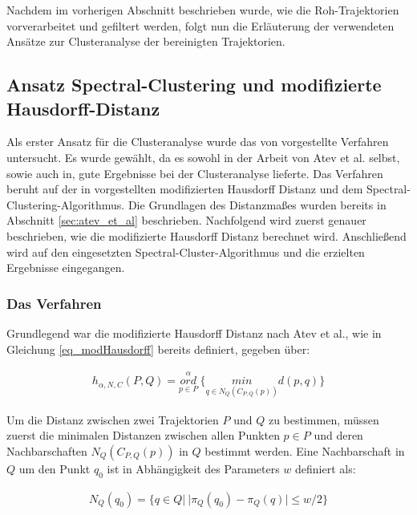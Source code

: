 Nachdem im vorherigen Abschnitt beschrieben wurde, wie die Roh-Trajektorien vorverarbeitet und gefiltert
werden, folgt nun die Erläuterung der verwendeten Ansätze zur Clusteranalyse der bereinigten Trajektorien.

\subsection{Ansatz Spectral-Clustering und modifizierte Hausdorff-Distanz}
\label{sec:real_ansatz_spec_modHD}

Als erster Ansatz für die Clusteranalyse wurde das von \cite[]{Atev2010} vorgestellte Verfahren untersucht.
Es wurde gewählt, da es sowohl in der Arbeit von Atev et al. selbst, sowie auch in\cite[]{Morris2009}, gute Ergebnisse
bei der Clusteranalyse lieferte.
Das Verfahren beruht auf der in \cite[]{Atev2006} vorgestellten modifizierten Hausdorff Distanz und dem
Spectral-Clustering-Algorithmus. Die Grundlagen des Distanzmaßes wurden bereits in Abschnitt
\ref{sec:atev_et_al} beschrieben. Nachfolgend wird zuerst genauer beschrieben, wie die
modifizierte Hausdorff Distanz berechnet wird. Anschließend
wird auf den eingesetzten Spectral-Cluster-Algorithmus und die erzielten Ergebnisse eingegangen.

\subsubsection{Das Verfahren}

Grundlegend war die modifizierte Hausdorff Distanz nach Atev et al., wie in Gleichung \ref{eq_modHausdorff}
bereits definiert, gegeben über:

\begin{ceqn}
\begin{align*}
    h_{\alpha, N, C}(P, Q) = \overset{\alpha}{\underset{p \in P}{ord}}\ \Big\{ \underset{q \in N_Q(C_{P,Q}(p))}{min} d(p, q) \Big\}
\end{align*}
\end{ceqn}

Um die Distanz zwischen zwei Trajektorien $P$ und $Q$ zu bestimmen, müssen zuerst die minimalen Distanzen
zwischen allen Punkten $p \in P$ und deren Nachbarschaften $N_Q(C_{P,Q}(p))$ in $Q$ bestimmt werden.
Eine Nachbarschaft in $Q$ um den Punkt $q_0$ ist in Abhängigkeit des Parameters $w$ definiert als:

\begin{ceqn}
\begin{align}
    N_Q(q_0) = \{ q \in Q |\ |\pi_Q(q_0) - \pi_Q(q)| \le w/2 \}
\end{align}
\end{ceqn}

